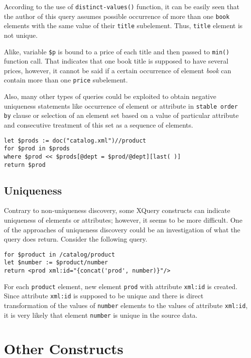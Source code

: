 According to the use of \texttt{distinct-values()} function, it can be easily seen that the author of this query assumes possible occurrence of more than one \texttt{book} elements with the same value of their \texttt{title} subelement. Thus, \texttt{title} element is not unique.

Alike, variable \texttt{\$p} is bound to a price of each title and then passed to \texttt{min()} function call. That indicates that one book title is supposed to have several prices, however, it cannot be said if a certain occurrence of element \emph{book} can contain more than one \texttt{price} subelement.

Also, many other types of queries could be exploited to obtain negative uniqueness statements like occurrence of element or attribute in \texttt{stable order by} clause or selection of an element set based on a value of particular attribute and consecutive treatment of this set as a sequence of elements.

\begin{verbatim}
let $prods := doc("catalog.xml")//product 
for $prod in $prods 
where $prod << $prods[@dept = $prod/@dept][last( )] 
return $prod 
\end{verbatim}

\subsection{Uniqueness}
Contrary to non-uniqueness discovery, some XQuery constructs can indicate uniqueness of elements or attributes; however, it seems to be more difficult. One of the approaches of uniqueness discovery could be an investigation of what the query does return. Consider the following query.

\begin{verbatim}
for $product in /catalog/product
let $number := $product/number
return <prod xml:id="{concat('prod', number)}"/>
\end{verbatim}

For each \texttt{product} element, new element \texttt{prod} with attribute \texttt{xml:id} is created. Since attribute \texttt{xml:id} is supposed to be unique and there is direct transformation of the values of \texttt{number} elements to the values of attribute \texttt{xml:id}, it is very likely that element \texttt{number} is unique in the source data.

\section{Other Constructs}

